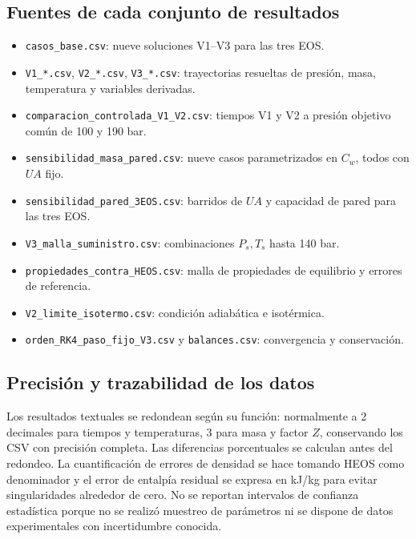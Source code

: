 \documentclass[11pt,letterpaper]{article}
\begin{document}
\subsection{Fuentes de cada conjunto de resultados}
\begin{itemize}
\item \texttt{casos\_base.csv}: nueve soluciones V1--V3 para las tres EOS.
\item \texttt{V1\_*.csv}, \texttt{V2\_*.csv}, \texttt{V3\_*.csv}: trayectorias resueltas de presión, masa, temperatura y variables derivadas.
\item \texttt{comparacion\_controlada\_V1\_V2.csv}: tiempos V1 y V2 a presión objetivo común de 100 y 190 bar.
\item \texttt{sensibilidad\_masa\_pared.csv}: nueve casos parametrizados en $C_w$, todos con $UA$ fijo.
\item \texttt{sensibilidad\_pared\_3EOS.csv}: barridos de $UA$ y capacidad de pared para las tres EOS.
\item \texttt{V3\_malla\_suministro.csv}: combinaciones $P_s,T_s$ hasta 140 bar.
\item \texttt{propiedades\_contra\_HEOS.csv}: malla de propiedades de equilibrio y errores de referencia.
\item \texttt{V2\_limite\_isotermo.csv}: condición adiabática e isotérmica.
\item \texttt{orden\_RK4\_paso\_fijo\_V3.csv} y \texttt{balances.csv}: convergencia y conservación.
\end{itemize}

\subsection{Precisión y trazabilidad de los datos}
Los resultados textuales se redondean según su función: normalmente a 2 decimales para tiempos y temperaturas, 3 para masa y factor $Z$, conservando los CSV con precisión completa. Las diferencias porcentuales se calculan antes del redondeo. La cuantificación de errores de densidad se hace tomando HEOS como denominador y el error de entalpía residual se expresa en kJ/kg para evitar singularidades alrededor de cero. No se reportan intervalos de confianza estadística porque no se realizó muestreo de parámetros ni se dispone de datos experimentales con incertidumbre conocida.

\clearpage
\onecolumn
\end{document}

